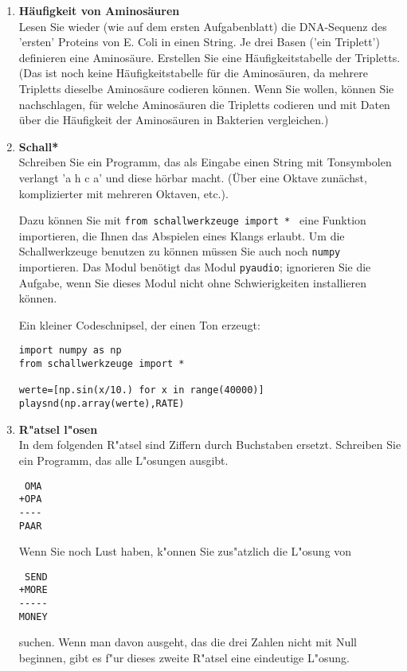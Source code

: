 \begin{enumerate}[1.]
\item \textbf{Häufigkeit von Aminosäuren}\\
Lesen Sie wieder (wie auf dem ersten Aufgabenblatt) die DNA-Sequenz
des 'ersten' Proteins von E. Coli in einen String.  Je drei Basen ('ein Triplett')
definieren eine Aminosäure. Erstellen Sie eine Häufigkeitstabelle
der Tripletts.\\
(Das ist noch keine Häufigkeitstabelle für die Aminosäuren,
da mehrere Tripletts dieselbe Aminosäure codieren können. Wenn Sie wollen, können Sie nachschlagen, für welche Aminosäuren die Tripletts codieren und mit Daten über die Häufigkeit der Aminosäuren
in Bakterien vergleichen.)

\item \textbf{Schall*}\\
Schreiben Sie ein Programm, das als Eingabe einen String mit Tonsymbolen
verlangt 'a h c a' und diese hörbar macht. (Über eine Oktave zunächst,
komplizierter mit mehreren Oktaven, etc.).

Dazu können Sie mit \texttt{from schallwerkzeuge import * }
eine Funktion importieren, die Ihnen das Abspielen eines Klangs 
erlaubt. Um die Schallwerkzeuge benutzen zu können müssen Sie
auch noch \texttt{numpy} importieren. Das Modul benötigt 
das Modul \texttt{pyaudio}; ignorieren Sie die Aufgabe, wenn
Sie dieses Modul nicht ohne Schwierigkeiten installieren können.

Ein kleiner Codeschnipsel, der einen Ton erzeugt:

\begin{lstlisting}
import numpy as np
from schallwerkzeuge import *

werte=[np.sin(x/10.) for x in range(40000)]
playsnd(np.array(werte),RATE)
\end{lstlisting}


\item \textbf{R"atsel l"osen}\\
In dem folgenden R"atsel sind Ziffern durch Buchstaben ersetzt.
Schreiben Sie ein Programm, das alle L"osungen ausgibt.
\begin{verbatim}
 OMA
+OPA
----
PAAR
\end{verbatim}
Wenn Sie noch Lust haben, k"onnen Sie zus"atzlich die L"osung von
\begin{verbatim}
 SEND
+MORE
-----
MONEY
\end{verbatim}
suchen. Wenn man davon ausgeht, das die drei Zahlen nicht mit Null beginnen,
gibt es f"ur dieses zweite R"atsel eine eindeutige L"osung.



\end{enumerate}
